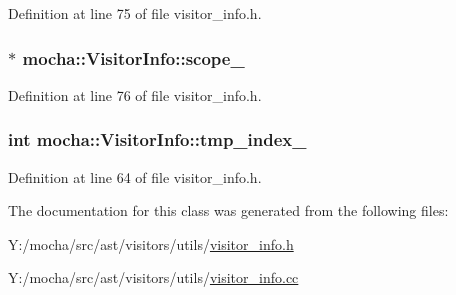 Definition at line 75 of file visitor\_\-info.h.

\hypertarget{classmocha_1_1_visitor_info_a7788c3716dc699501e3352801b58e5d9}{
\subsubsection[{scope\_\-}]{$\ast$ {\bf mocha::VisitorInfo::scope\_\-}}}
\label{classmocha_1_1_visitor_info_a7788c3716dc699501e3352801b58e5d9}


Definition at line 76 of file visitor\_\-info.h.

\hypertarget{classmocha_1_1_visitor_info_a9f4d31c6893552b77f92719871334fe6}{
\subsubsection[{tmp\_\-index\_\-}]{\setlength{\rightskip}{0pt plus 5cm}int {\bf mocha::VisitorInfo::tmp\_\-index\_\-}}}
\label{classmocha_1_1_visitor_info_a9f4d31c6893552b77f92719871334fe6}


Definition at line 64 of file visitor\_\-info.h.



The documentation for this class was generated from the following files:\begin{DoxyCompactItemize}
\item 
Y:/mocha/src/ast/visitors/utils/\hyperlink{visitor__info_8h}{visitor\_\-info.h}\item 
Y:/mocha/src/ast/visitors/utils/\hyperlink{visitor__info_8cc}{visitor\_\-info.cc}\end{DoxyCompactItemize}
